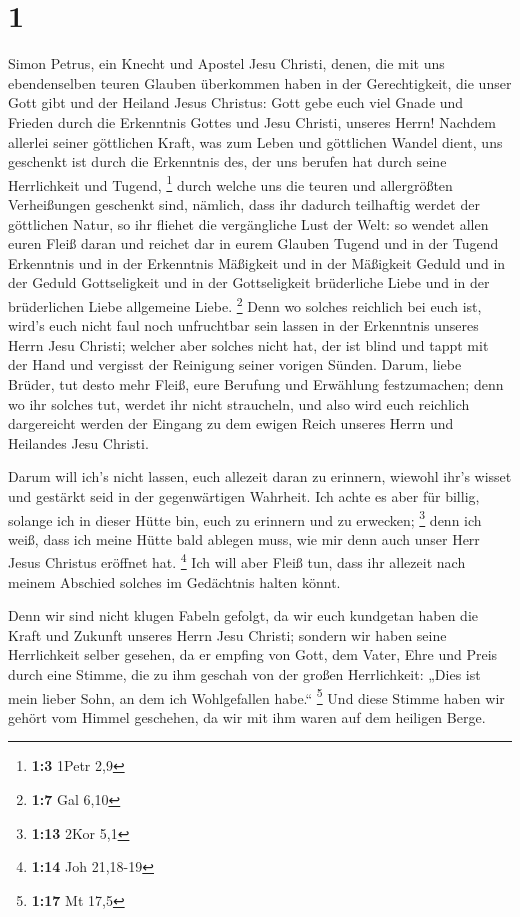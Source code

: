 \hypertarget{section}{%
\section{1}\label{section}}

 Simon Petrus, ein Knecht und Apostel Jesu Christi, denen,
die mit uns ebendenselben teuren Glauben überkommen haben in der
Gerechtigkeit, die unser Gott gibt und der Heiland Jesus Christus:
 Gott gebe euch viel Gnade und Frieden durch die Erkenntnis
Gottes und Jesu Christi, unseres Herrn!  Nachdem allerlei
seiner göttlichen Kraft, was zum Leben und göttlichen Wandel dient, uns
geschenkt ist durch die Erkenntnis des, der uns berufen hat durch seine
Herrlichkeit und Tugend, \footnote{\textbf{1:3} 1Petr 2,9} 
durch welche uns die teuren und allergrößten Verheißungen geschenkt
sind, nämlich, dass ihr dadurch teilhaftig werdet der göttlichen Natur,
so ihr fliehet die vergängliche Lust der Welt:  so wendet
allen euren Fleiß daran und reichet dar in eurem Glauben Tugend und in
der Tugend Erkenntnis  und in der Erkenntnis Mäßigkeit und
in der Mäßigkeit Geduld und in der Geduld Gottseligkeit  und
in der Gottseligkeit brüderliche Liebe und in der brüderlichen Liebe
allgemeine Liebe. \footnote{\textbf{1:7} Gal 6,10}  Denn wo
solches reichlich bei euch ist, wird's euch nicht faul noch unfruchtbar
sein lassen in der Erkenntnis unseres Herrn Jesu Christi; 
welcher aber solches nicht hat, der ist blind und tappt mit der Hand und
vergisst der Reinigung seiner vorigen Sünden.  Darum, liebe
Brüder, tut desto mehr Fleiß, eure Berufung und Erwählung festzumachen;
denn wo ihr solches tut, werdet ihr nicht straucheln,  und
also wird euch reichlich dargereicht werden der Eingang zu dem ewigen
Reich unseres Herrn und Heilandes Jesu Christi.

 Darum will ich's nicht lassen, euch allezeit daran zu
erinnern, wiewohl ihr's wisset und gestärkt seid in der gegenwärtigen
Wahrheit.  Ich achte es aber für billig, solange ich in
dieser Hütte bin, euch zu erinnern und zu erwecken; \footnote{\textbf{1:13}
  2Kor 5,1}  denn ich weiß, dass ich meine Hütte bald
ablegen muss, wie mir denn auch unser Herr Jesus Christus eröffnet hat.
\footnote{\textbf{1:14} Joh 21,18-19}  Ich will aber Fleiß
tun, dass ihr allezeit nach meinem Abschied solches im Gedächtnis halten
könnt.

 Denn wir sind nicht klugen Fabeln gefolgt, da wir euch
kundgetan haben die Kraft und Zukunft unseres Herrn Jesu Christi;
sondern wir haben seine Herrlichkeit selber gesehen,  da er
empfing von Gott, dem Vater, Ehre und Preis durch eine Stimme, die zu
ihm geschah von der großen Herrlichkeit: „Dies ist mein lieber Sohn, an
dem ich Wohlgefallen habe.`` \footnote{\textbf{1:17} Mt 17,5}
 Und diese Stimme haben wir gehört vom Himmel geschehen, da
wir mit ihm waren auf dem heiligen Berge.

